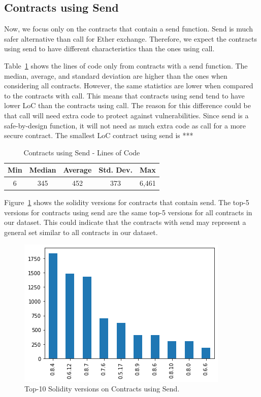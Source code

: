 \documentclass[10pt,conference]{IEEEtran}
\begin{document}
\subsection{Contracts using Send}

Now, we focus only on the contracts that contain a send function. Send is much safer alternative than call for Ether exchange. Therefore,  we expect the contracts using send to have different characteristics than the ones using call.  

Table~\ref{tab:send-loc} shows the lines of code only from contracts with a send function.  The median, average,  and standard deviation are higher than the ones when considering all contracts.  However,  the same statistics are lower when compared to the contracts with call.  This means that contracts using send tend to have lower LoC than the contracts using call. The reason for this difference could be that call will need extra code to protect against vulnerabilities. Since send is a safe-by-design function,  it will not need as much extra code as call for a more secure contract.  The smallest LoC contract using send is ***

\begin{table}[t]
\center
  \caption{Contracts using Send - Lines of Code}
  \label{tab:send-loc}
  \begin{tabular}{c c c c c}
    \hline
    Min & Median & Average & Std. Dev. & Max \\
    \hline
   6 & 345 & 452 & 373 & 6,461 \\
  \hline
\end{tabular}
\end{table}

Figure~\ref{fig:send_version} shows the solidity versions for contracts that contain send.  The top-5 versions for contracts using send are the same top-5 versions for all contracts in our dataset.  This could indicate that the contracts with send may represent a general set similar to all contracts in our dataset.

\begin{figure}[h]
  \centering
  \includegraphics[width=\linewidth]{img/send_versions_clean.png}
  \caption{Top-10 Solidity versions on Contracts using Send.}
  \label{fig:send_version}
\end{figure}
\end{document}
